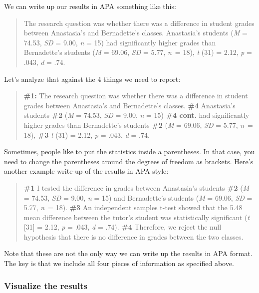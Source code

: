 \documentclass[
]{book}
\begin{document}
We can write up our results in APA something like this:

\begin{quote}
The research question was whether there was a difference in student grades between Anastasia's and Bernadette's classes. Anastasia's students (\emph{M} = 74.53, \emph{SD} = 9.00, \emph{n} = 15) had significantly higher grades than Bernadette's students (\emph{M} = 69.06, \emph{SD} = 5.77, \emph{n}~= 18), \emph{t} (31) = 2.12, \emph{p} = .043, \emph{d} = .74.
\end{quote}

Let's analyze that against the 4 things we need to report:

\begin{quote}
\textbf{\#1:} The research question was whether there was a difference in student grades between Anastasia's and Bernadette's classes. \textbf{\#4} Anastasia's students \textbf{\#2} (\emph{M} = 74.53, \emph{SD} = 9.00, \emph{n} = 15) \textbf{\#4 cont.} had significantly higher grades than Bernadette's students \textbf{\#2} (\emph{M} = 69.06, \emph{SD} = 5.77, \emph{n}~= 18), \textbf{\#3} \emph{t} (31) = 2.12, \emph{p} = .043, \emph{d} = .74.
\end{quote}

Sometimes, people like to put the statistics inside a parentheses. In that case, you need to change the parentheses around the degrees of freedom as brackets. Here's another example write-up of the results in APA style:

\begin{quote}
\textbf{\#1} I tested the difference in grades between Anastasia's students \textbf{\#2} (\emph{M} = 74.53, \emph{SD} = 9.00, \emph{n} = 15) and Bernadette's students (\emph{M} = 69.06, \emph{SD} = 5.77, \emph{n}~= 18). \textbf{\#3} An independent samples t-test showed that the 5.48 mean difference between the tutor's student was statistically significant (\emph{t} {[}31{]} = 2.12, \emph{p} = .043, \emph{d} = .74). \textbf{\#4} Therefore, we reject the null hypothesis that there is no difference in grades between the two classes.
\end{quote}

Note that these are not the only way we can write up the results in APA format. The key is that we include all four pieces of information as specified above.

\hypertarget{visualize-the-results-1}{%
\subsubsection{Visualize the results}\label{visualize-the-results-1}}
\end{document}

